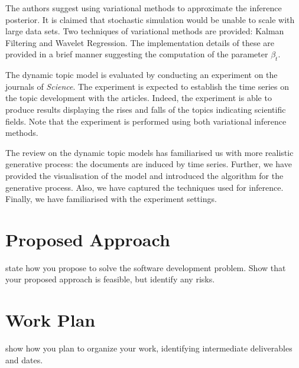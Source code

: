 \documentclass{mprop}
\begin{document}
\par The authors suggest using variational methods to approximate the inference posterior. It is claimed that stochastic simulation would be unable to scale with large data sets. Two techniques of variational methods are provided: Kalman Filtering and Wavelet Regression. The implementation details of these are provided in a brief manner suggesting the computation of the parameter $\beta_t$. 

\par The dynamic topic model is evaluated by conducting an experiment on the journals of \textit{Science}. The experiment is expected to establish the time series on the topic development with the articles. Indeed, the experiment is able to produce results displaying the rises and falls of the topics indicating scientific fields. Note that the experiment is performed using both variational inference methods.   

\par The review on the dynamic topic models has familiarised us with more realistic generative process: the documents are induced by time series. Further, we have provided the visualisation of the model and introduced the algorithm for the generative process. Also, we have captured the techniques used for inference. Finally, we have familiarised with the experiment settings. 






\section{Proposed Approach}

state how you propose to solve the software development problem. Show that your proposed approach is feasible, but identify any risks.

\section{Work Plan}

show how you plan to organize your work, identifying intermediate deliverables and dates.



\end{document}
